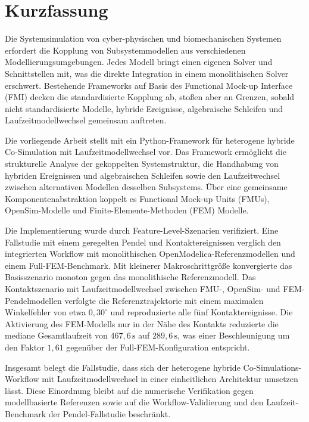 \chapter*{Kurzfassung}

Die Systemsimulation von cyber-physischen und biomechanischen Systemen erfordert die Kopplung von Subsystemmodellen aus verschiedenen Modellierungsumgebungen.
Jedes Modell bringt einen eigenen Solver und Schnittstellen mit, was die direkte Integration in einem monolithischen Solver erschwert.
Bestehende Frameworks auf Basis des Functional Mock-up Interface (FMI) decken die standardisierte Kopplung ab, stoßen aber an Grenzen, sobald nicht standardisierte Modelle, hybride Ereignisse, algebraische Schleifen und Laufzeitmodellwechsel gemeinsam auftreten.

Die vorliegende Arbeit stellt mit \syssimx{} ein Python-Framework für heterogene hybride Co-Simulation mit Laufzeitmodellwechsel vor.
Das Framework ermöglicht die strukturelle Analyse der gekoppelten Systemstruktur, die Handhabung von hybriden Ereignissen und algebraischen Schleifen sowie den Laufzeitwechsel zwischen alternativen Modellen desselben Subsystems.
Über eine gemeinsame Komponentenabstraktion koppelt es Functional Mock-up Units (FMUs), OpenSim-Modelle und Finite-Elemente-Methoden (FEM) Modelle.

Die Implementierung wurde durch Feature-Level-Szenarien verifiziert.
Eine Fallstudie mit einem geregelten Pendel und Kontaktereignissen verglich den integrierten Workflow mit monolithischen OpenModelica-Referenzmodellen und einem Full-FEM-Benchmark.
Mit kleinerer Makroschrittgröße konvergierte das Basisszenario monoton gegen das monolithische Referenzmodell.
Das Kontaktszenario mit Laufzeitmodellwechsel zwischen FMU-, OpenSim- und FEM-Pendelmodellen verfolgte die Referenztrajektorie mit einem maximalen Winkelfehler von etwa $0{,}30^\circ$ und reproduzierte alle fünf Kontaktereignisse.
Die Aktivierung des FEM-Modells nur in der Nähe des Kontakts reduzierte die mediane Gesamtlaufzeit von $467{,}6\,\mathrm{s}$ auf $289{,}6\,\mathrm{s}$, was einer Beschleunigung um den Faktor $1{,}61$ gegenüber der Full-FEM-Konfiguration entspricht.

Insgesamt belegt die Fallstudie, dass sich der heterogene hybride Co-Simulations-Workflow mit Laufzeitmodellwechsel in einer einheitlichen Architektur umsetzen lässt.
Diese Einordnung bleibt auf die numerische Verifikation gegen modellbasierte Referenzen sowie auf die Workflow-Validierung und den Laufzeit-Benchmark der Pendel-Fallstudie beschränkt.